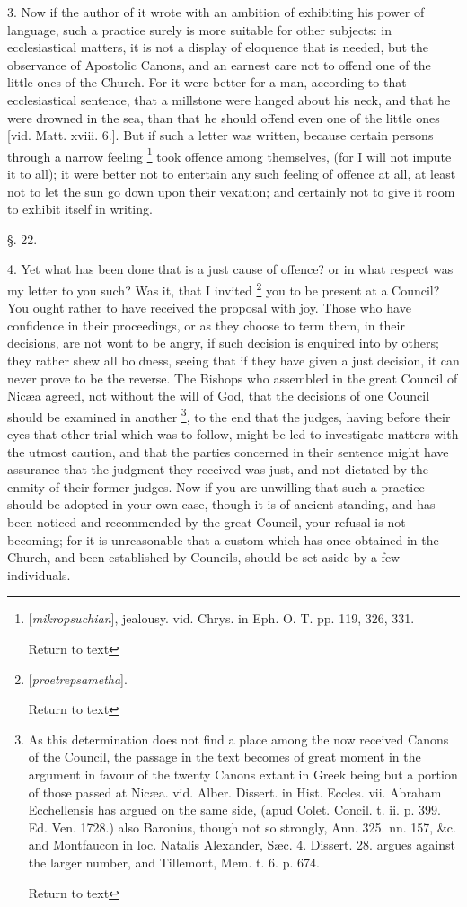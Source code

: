 3. Now if the author of it wrote with an ambition
of exhibiting his power of language, such a practice surely is more
suitable for other subjects: in ecclesiastical matters, it is not
a display of eloquence that is needed, but the observance of Apostolic
Canons, and an earnest care not to offend one of the little ones of
the Church. For it were better for a man, according to that
ecclesiastical sentence, that a millstone were hanged about his neck,
and that he were drowned in the sea, than that he should offend even
one of the little ones [vid. Matt. xviii. 6.]. But if such a letter
was written, because certain persons through a narrow feeling \footnote{[\emph{mikropsuchian}], jealousy. vid. Chrys. in Eph. O. T. pp. 119,
326, 331.

Return to text} took offence among themselves, (for I will not impute it to
all); it were better not to entertain any such feeling of offence at
all, at least not to let the sun go down upon their vexation; and
certainly not to give it room to exhibit itself in writing.

§. 22.

4. Yet what has been done that is a just cause of
offence? or in what respect was my letter to you such? Was it, that I
invited \footnote{[\emph{proetrepsametha}].

Return to text} you to be
present at a Council? You ought rather to have received the proposal
with joy. Those who have confidence in their proceedings, or as they
choose to term them, in their decisions, are not wont to be angry, if
such decision is enquired into by others; they rather shew all
boldness, seeing that if they have given a just decision, it can never
prove to be the reverse. The Bishops who assembled in the great
Council of Nicæa agreed, not without the will of God, that the
decisions of one Council should be examined in another \footnote{As this determination does not find a place among the now received
Canons of the Council, the passage in the text becomes of great moment
in the argument in favour of the twenty Canons extant in Greek being
but a portion of those passed at Nicæa. vid. Alber. Dissert. in Hist.
Eccles. vii. Abraham Ecchellensis has argued on the same side, (apud
Colet. Concil. t. ii. p. 399. Ed. Ven. 1728.) also Baronius, though
not so strongly, Ann. 325. nn. 157, \&c. and Montfaucon in loc.
Natalis Alexander, Sæc. 4. Dissert. 28. argues against the larger
number, and Tillemont, Mem. t. 6. p. 674.

Return to text}, to the end that the judges, having before their eyes that
other trial which was to follow, might be led to investigate matters
with the utmost caution, and that the parties concerned in their
sentence might have assurance that the judgment they received was
just, and not dictated by the enmity of their former judges. Now if
you are unwilling that such a practice should be adopted in your own
case, though it is of ancient standing, and has been noticed and
recommended by the great Council, your refusal is not becoming; for it
is unreasonable that a custom which has once obtained in the
Church, and been established by Councils, should be set aside by a few
individuals.

